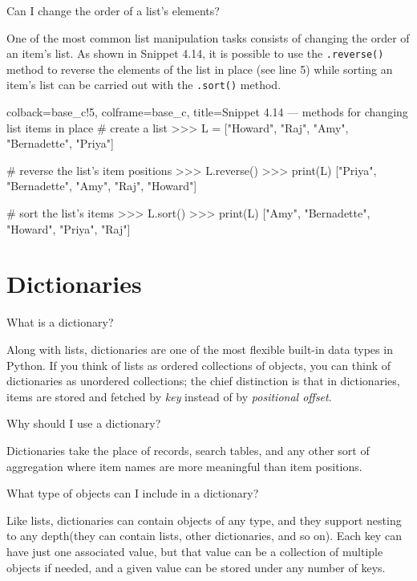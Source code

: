\documentclass[a4paper,11pt]{book}
\newcommand{\question}[1]{%
    \begin{tcolorbox}[colback=comp_c!10,colframe=comp_c,sidebyside align=top,width=\linewidth,before skip=1ex]
        #1
    \end{tcolorbox}
    \switchcolumn%
}
\newcommand{\note}[1]{%
    \begin{tcolorbox}[colback=white!0,colframe=white!10,width=\linewidth,before skip=1ex]
        #1
    \end{tcolorbox}
}
\begin{document}
\begin{paracol}{2}
	\question{\raggedright Can I change the order of a list's elements?}
	\note{One of the most common list manipulation tasks consists of changing the order of an item's list. As shown in Snippet 4.14, it is possible to use the \texttt{.reverse()} method to reverse the elements of the list in place (see line 5) while sorting an item's list can be carried out with the \texttt{.sort()} method.}
\end{paracol}

\begin{pythoncode}[linenos=true,]{colback=base_c!5, colframe=base_c, title=\sffamily Snippet 4.14 --- methods for changing list items in place}
# create a list 
>>> L = ["Howard", "Raj", "Amy", "Bernadette", "Priya"]

# reverse the list's item positions
>>> L.reverse()
>>> print(L)
["Priya", "Bernadette", "Amy", "Raj", "Howard"]

# sort the list's items
>>> L.sort()
>>> print(L)
["Amy", "Bernadette", "Howard", "Priya", "Raj"]

\end{pythoncode}

\section{Dictionaries}
\label{sec:dictionaries}

\begin{paracol}{2}
	\question{\raggedright What is a dictionary?}
	\note{Along with lists, dictionaries are one of the most flexible built-in data types in Python. If you think of lists as ordered collections of objects, you can think of dictionaries as unordered collections; the chief distinction is that in dictionaries, items are stored and fetched by \emph{key} instead of by \emph{positional offset}.}
\end{paracol}

\begin{paracol}{2}
	\question{\raggedright Why should I use a dictionary?}
	\note{Dictionaries take the place of records, search tables, and any other sort of aggregation where item names are more meaningful than item positions.}
\end{paracol}

\begin{paracol}{2}
	\question{\raggedright What type of objects can I include in a dictionary?}
	\note{Like lists, dictionaries can contain objects of any type, and they support nesting to any depth(they can contain lists, other dictionaries, and so on). Each key can have just one associated value, but that value can be a collection of multiple objects if needed, and a given value can be stored under any number of keys.}
\end{paracol}
\clearpage
\end{document}
